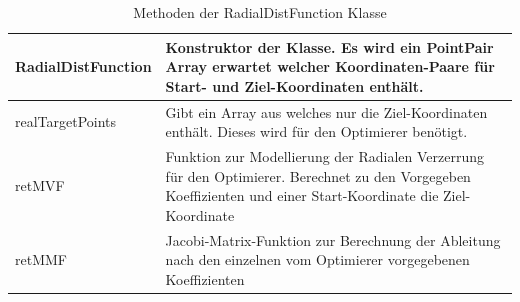 \begin{table}[H]
	\begin{tabular}{|p{} | p{}|} 
		\hline
		RadialDistFunction & Konstruktor der Klasse. Es wird ein PointPair Array erwartet welcher Koordinaten-Paare für Start- und Ziel-Koordinaten enthält.\\ \hline
		realTargetPoints & Gibt ein Array aus welches nur die Ziel-Koordinaten enthält. Dieses wird für den Optimierer benötigt.\\ \hline
		retMVF & Funktion zur Modellierung der Radialen Verzerrung für den Optimierer. Berechnet zu den Vorgegeben Koeffizienten und einer Start-Koordinate die Ziel-Koordinate\\ \hline
		retMMF & Jacobi-Matrix-Funktion zur Berechnung der Ableitung nach den einzelnen vom Optimierer vorgegebenen Koeffizienten \\ 
		\hline
	\end{tabular}
	\caption{Methoden der RadialDistFunction Klasse}
\end{table}

